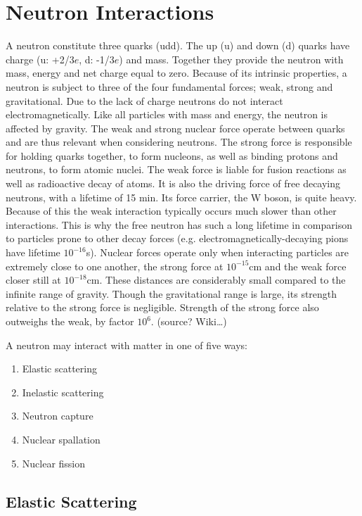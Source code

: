 \section{Neutron Interactions}

A neutron constitute three quarks (udd). The up (u) and down (d) quarks have charge (u: +2/3$e$, d: -1/3$e$) and mass. Together they provide the neutron with mass, energy and net charge equal to zero. Because of its intrinsic properties, a neutron is subject to three of the four fundamental forces; weak, strong and gravitational. Due to the lack of charge neutrons do not interact electromagnetically.
Like all particles with mass and energy, the neutron is affected by gravity. The weak and strong nuclear force operate between quarks and are thus relevant when considering neutrons. The strong force is responsible for holding quarks together, to form nucleons, as well as binding protons and neutrons, to form atomic nuclei. The weak force is liable for fusion reactions as well as radioactive decay of atoms. It is also the driving force of free decaying neutrons, with a lifetime of 15 min. Its force carrier, the W boson, is quite heavy. Because of this the weak interaction typically occurs much slower than other interactions. This is why the free neutron has such a long lifetime in comparison to particles prone to other decay forces (e.g. electromagnetically-decaying pions have lifetime $10^{-16}$s).
Nuclear forces operate only when interacting particles are extremely close to one another, the strong force at $10^{-15}$cm and the weak force closer still at $10^{-18}$cm. These distances are considerably small compared to the infinite range of gravity. Though the gravitational range is large, its strength relative to the strong force is negligible. Strength of the strong force also outweighs the weak, by factor $10^6$. (source? Wiki…)

A neutron may interact with matter in one of five ways:
    \begin{enumerate}[noitemsep]
      \item Elastic scattering
      \item Inelastic scattering
      \item Neutron capture
      \item Nuclear spallation
      \item Nuclear fission
    \end{enumerate}

\subsection{Elastic Scattering}

